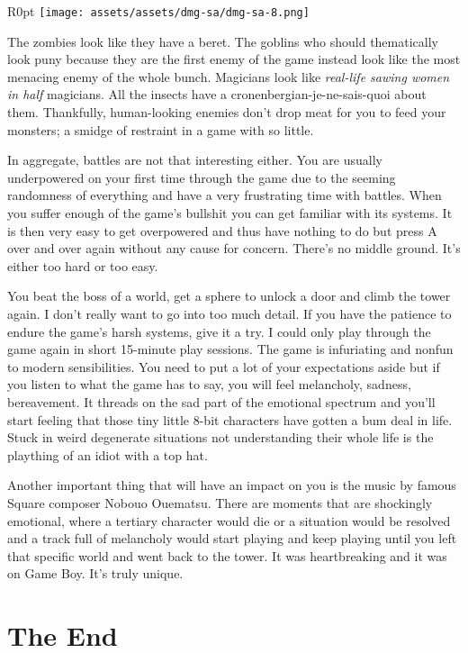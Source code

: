 \documentclass{book}
\begin{document}
\begin{wrapfigure}{R}{0pt} \texttt{[image: assets/assets/dmg-sa/dmg-sa-8.png]}\end{wrapfigure}
The zombies look like they have a beret. The goblins who should thematically look puny because they are the first enemy of the game instead look like the most menacing enemy of the whole bunch. Magicians look like \emph{real-life sawing women in half} magicians. All the insects have a cronenbergian-je-ne-sais-quoi about them. Thankfully, human-looking enemies don’t drop meat for you to feed your monsters; a smidge of restraint in a game with so little.

In aggregate, battles are not that interesting either. You are usually underpowered on your first time through the game due to the seeming randomness of everything and have a very frustrating time with battles. When you suffer enough of the game’s bullshit you can get familiar with its systems. It is then very easy to get overpowered and thus have nothing to do but press A over and over again without any cause for concern. There’s no middle ground. It’s either too hard or too easy.

You beat the boss of a world, get a sphere to unlock a door and climb the tower again. I don’t really want to go into too much detail. If you have the patience to endure the game’s harsh systems, give it a try. I could only play through the game again in short 15-minute play sessions. The game is infuriating and nonfun to modern sensibilities. You need to put a lot of your expectations aside but if you listen to what the game has to say, you will feel melancholy, sadness, bereavement. It threads on the sad part of the emotional spectrum and you’ll start feeling that those tiny little 8-bit characters have gotten a bum deal in life. Stuck in weird degenerate situations not understanding their whole life is the plaything of an idiot with a top hat.

Another important thing that will have an impact on you is the music by famous Square composer Nobouo Ouematsu. There are moments that are shockingly emotional, where a tertiary character would die or a situation would be resolved and a track full of melancholy would start playing and keep playing until you left that specific world and went back to the tower. It was heartbreaking and it was on Game Boy. It’s truly unique.

\FloatBarrier\needspace{10mm}\section*{The End}\nopagebreak[4]
\end{document}
